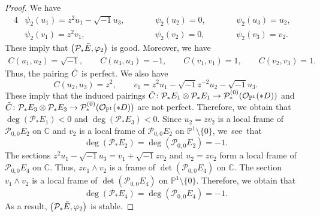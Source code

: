 \documentclass[10pt,a4paper]{amsart}
\numberwithin{equation}{section}
\newcommand{\C}{\mathbb{C}}
\newcommand{\ps}{\mathbb{P}}
\begin{document}
\begin{proof}
 We have
 \begin{alignat*}{4}
 &\psi_2(u_1)=z^2 u_1-\sqrt{-1}u_3,\qquad&& \psi_2(u_2)=0,\qquad&& \psi_2(u_3)=u_2,&\\
 &\psi_2(v_1)=z^2v_1,\qquad&& \psi_2(v_2)=0,\qquad&& \psi_2(v_3)=v_2.&
 \end{alignat*}
 These imply that $\bigl(\mathcal{P}_{*}\Tilde{E},\varphi_2\bigr)$ is good. Moreover, we have
 \begin{gather*}
 C(u_1,u_2)=\sqrt{-1},\qquad C(u_3,u_3)=-1,\qquad C(v_1,v_1)=1,\qquad C(v_2,v_3)=1.
 \end{gather*}
 Thus, the pairing $\Tilde{C}$ is perfect. We also have
 \begin{equation*}
 C(u_2,u_3)=z^2,\qquad v_1= z^2u_1-\sqrt{-1}z^{-2}u_2-\sqrt{-1}u_3.
 \end{equation*}
 These imply that the induced pairings $\Tilde{C}\colon \mathcal{P}_{*}E_1\otimes \mathcal{P}_{*}E_1\to \mathcal{P}^{(0)}_*(\mathcal{O}_{\ps^1}(*D))$ and $\Tilde{C}\colon \mathcal{P}_{*}E_3\otimes \mathcal{P}_{*}E_3 \to \mathcal{P}^{(0)}_*(\mathcal{O}_{\ps^1}(*D))$ are not perfect.
 Therefore, we obtain that $\deg(\mathcal{P}_{*}E_1)<0$ and $\deg(\mathcal{P}_{*}E_3)<0$. Since $u_2=zv_2$ is a local frame of $\mathcal{P}_{0,0}E_2$ on $\C$ and $v_2$ is a local frame of $\mathcal{P}_{0,0}E_2$ on $\ps^1\setminus \{0\}$, we~see~that
 \begin{equation*}
 \deg(\mathcal{P}_{*}E_2) = \deg(\mathcal{P}_{0,0}E_2) = -1.
 \end{equation*}
 The sections $z^2u_1-\sqrt{-1}u_3=v_1+\sqrt{-1}zv_2$ and $u_2=zv_2$ form a local frame of $\mathcal{P}_{0,0}E_4$ on $\C$. Thus, $zv_1\wedge v_2$ is a frame of $\det(\mathcal{P}_{0,0}E_4)$ on $\C$. The section $v_1\wedge v_2$ is a local frame of $\det(\mathcal{P}_{0,0}E_4)$ on $\ps^1\setminus \{0\}$. Therefore, we obtain that
 \begin{equation*}
 \deg(\mathcal{P}_{*}E_4) = \deg(\mathcal{P}_{0,0}E_4) = -1.
 \end{equation*}
 As a result, $\bigl(\mathcal{P}_{*}\Tilde{E},\varphi_2\bigr)$ is stable.
\end{proof}
\end{document}

